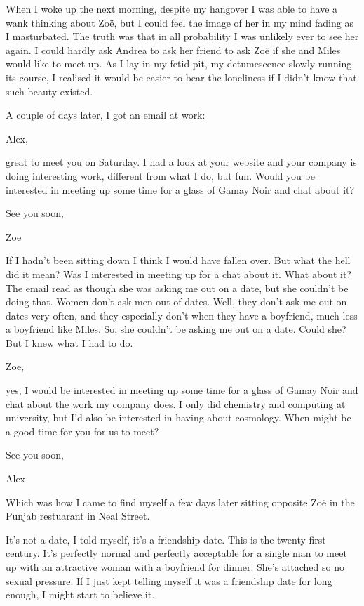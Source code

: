 When I woke up the next morning, despite my hangover I was able to
have a wank thinking about Zoë, but I could feel the image of
her in my mind fading as I masturbated. The truth was that in all probability I was
unlikely ever to see her again. I could hardly ask Andrea to ask her
friend to ask Zoë if she and Miles would like to meet up. As I lay in my fetid pit, my detumescence
slowly running its course, I realised it
would be easier to bear the loneliness if I didn't know that such
beauty existed.

A couple of days later, I got an email at work:

\startmessage 
Alex,

great to meet you on Saturday. I had a look at your website and your
company is doing interesting work, different from what I do, but
fun. Would you be interested in meeting up some time for a glass of
Gamay Noir and chat about it?

See you soon,

Zoe
\stopmessage

If I hadn't been sitting down I think I would have fallen over. But
what the hell did it mean? Was I interested in meeting up for a chat
about it. What about it? The email read as though she was asking me
out on a date, but she couldn't be doing that. Women don't ask men
out of dates. Well, they don't ask me out on dates very often, and
they especially don't when they have a boyfriend, much less a
boyfriend like Miles. So, she couldn't be asking me out on a date.
Could she? But I knew what I had to do.

\startmessage 
Zoe,

yes, I would be interested in meeting up some time for a glass of
Gamay Noir and chat about the work my company does. I only did
chemistry and computing at university, but I'd also be interested in
having about cosmology. When might be a good time for you for us to
meet?

See you soon,

Alex
\stopmessage

Which was how I came to find myself a few days later sitting
opposite Zoë in the Punjab restuarant in Neal Street.

It's not a {\twelveit date\/}, I told myself, it's a {\twelveit
friendship\/} date. This is the twenty-first century. It's perfectly
normal and perfectly acceptable for a single man to meet up with an
attractive woman with a boyfriend for dinner. She's attached so no
sexual pressure. If I just kept telling myself it was a friendship
date for long enough, I might start to believe it.


